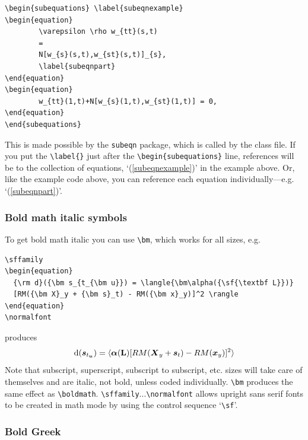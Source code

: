 \documentclass{gAPA2e}
\theoremstyle{plain}
\theoremstyle{remark}
\theoremstyle{definition}
\begin{document}
\begin{verbatim}
\begin{subequations} \label{subeqnexample}
\begin{equation}
        \varepsilon \rho w_{tt}(s,t)
        =
        N[w_{s}(s,t),w_{st}(s,t)]_{s},
        \label{subeqnpart}
\end{equation}
\begin{equation}
        w_{tt}(1,t)+N[w_{s}(1,t),w_{st}(1,t)] = 0,
\end{equation}
\end{subequations}
\end{verbatim}
This is made possible by the \texttt{subeqn} package, which is called
by the class file. If you put the \verb"\label{}" just after the
\verb"\begin{subequations}" line, references will be to the
collection of equations, `(\ref{subeqnexample})' in the example
above. Or, like the example code above, you can reference each
equation individually---e.g. `(\ref{subeqnpart})'.

\subsubsection{Bold math italic symbols}

To get bold math italic you can use \verb"\bm", which works for
all sizes, e.g.
%
\begin{verbatim}
\sffamily
\begin{equation}
  {\rm d}({\bm s_{t_{\bm u}}) = \langle{\bm\alpha({\sf{\textbf L}})}
  [RM({\bm X}_y + {\bm s}_t) - RM({\bm x}_y)]^2 \rangle
\end{equation}
\normalfont
\end{verbatim}
%
produces\sffamily
\begin{equation}
  {\rm d}({\bm s_{t_{\bm u}}}) = \langle {\bm\alpha({\sf{\textbf L}})}[RM({\bm X}_y
  + {\bm s}_t) - RM({\bm x}_y)]^2 \rangle
\end{equation}\normalfont
Note that subscript, superscript, subscript to subscript, etc.
sizes will take care of themselves and are italic, not bold,
unless coded individually. \verb"\bm" produces the same effect as
\verb"\boldmath". \verb"\sffamily"...\verb"\normalfont" allows
upright sans serif fonts to be created in math mode by using the
control sequence `\verb"\sf"'.

\subsubsection{Bold Greek}\label{boldgreek}
\end{document}
